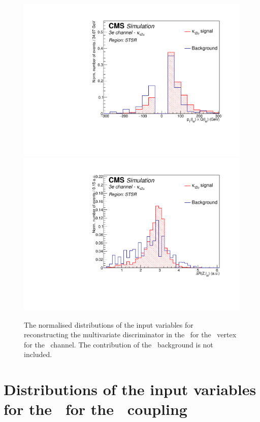 \begin{figure}[htbp]
	\includegraphics[width=0.3\linewidth]{6_Search/Figures/PlotsTechnics/ptWQZutsingletopeee_norm}
	\includegraphics[width=0.3\linewidth]{6_Search/Figures/PlotsTechnics/dRZWlepZutsingletopeee_norm}
	\caption{The normalised distributions of the input variables for reconstructing the multivariate discriminator in the \STSR\ for the \Zut\ vertex for the \eee\ channel. The contribution of the \NPL\ background is not included. }
	\label{fig:singletopZutnormalizedeee}
\end{figure}


\clearpage
\section{Distributions of the input variables for the \TTSR\ for the \Zut\ coupling}
\label{app:BDTcorrZutTop}

